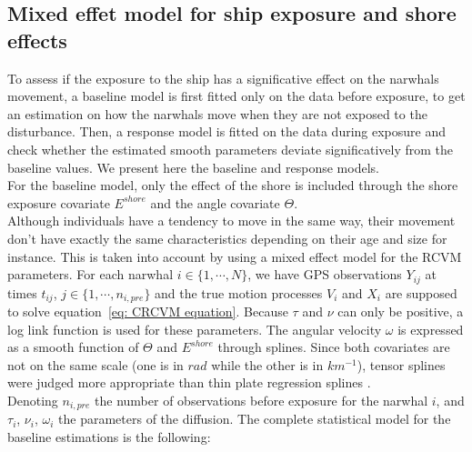 \documentclass[11pt]{article}
\newcommand {\1}{\mathbb{1}}
\begin{document}
\subsection{Mixed effet model for ship exposure and shore effects}
\label{subsection: ship exposure effect}


To assess if the exposure to the ship has a significative effect on the narwhals movement, a baseline model is first fitted only on the data before exposure, to get an estimation on how the narwhals move when they are not exposed to the disturbance. Then, a response model is fitted on the data during exposure and check whether the estimated smooth parameters deviate significatively from the baseline values. We present here the baseline and response models.\\

For the baseline model, only the effect of the shore is included through the shore exposure covariate $E^{shore}$ and the angle covariate $\Theta$.\\
Although individuals have a tendency to move in the same way, their movement don't have exactly the same characteristics depending on their age and size for instance. This is taken into account by using a mixed effect model for the RCVM parameters.
For each narwhal $i \in \{1, \cdots, N\}$, we have 	GPS observations $Y_{ij}$ at times $t_{ij}$, $j \in \{1,\cdots,n_{i,pre}\}$ and the true motion processes $V_i$ and $X_i$ are supposed to solve equation~\ref{eq: CRCVM equation}. Because $\tau$ and $\nu$ can only be positive, a log link function is used for these parameters. The angular velocity $\omega$ is expressed as a smooth function of $\Theta$ and $E^{shore}$ through splines. Since both covariates are not on the same scale (one is in $rad$ while the other is in $km^{-1}$), tensor splines were judged more appropriate than thin plate regression splines \cite{wood_generalized_2017}.\\

Denoting $n_{i,pre}$ the number of observations before exposure for the narwhal $i$, and $\tau_i$, $\nu_i$, $\omega_i$ the parameters of the diffusion. The complete statistical model for the baseline estimations is the following:
\end{document}
